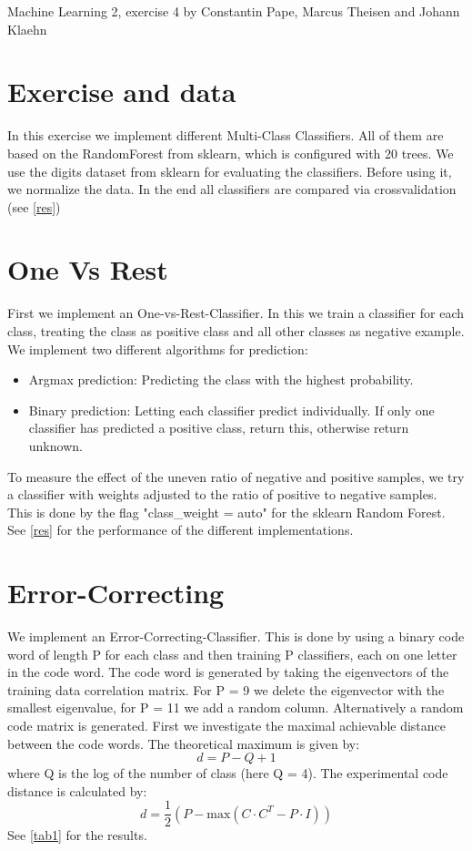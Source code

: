 \documentclass{article}
\begin{document}
Machine Learning 2, exercise 4 by Constantin Pape, Marcus Theisen and Johann Klaehn
 
\section{Exercise and data}

In this exercise we implement different Multi-Class Classifiers.
All of them are based on the RandomForest from sklearn, which is configured with 20 trees.
We use the digits dataset from sklearn for evaluating the classifiers.
Before using it, we normalize the data.
In the end all classifiers are compared via crossvalidation (see \autoref{res})

\section{One Vs Rest}

First we implement an One-vs-Rest-Classifier. In this we train a classifier for each class, treating the class as positive class and all other classes as negative example.
\newline
We implement two different algorithms for prediction:
\begin{itemize}
    \item Argmax prediction: Predicting the class with the highest probability.
    \item Binary prediction: Letting each classifier predict individually. If only one classifier has predicted a positive class, return this, otherwise return unknown.
\end{itemize}
To measure the effect of the uneven ratio of negative and positive samples, we try a classifier with weights adjusted to the ratio of positive to negative samples. 
This is done by the flag "class\_weight = auto" for the sklearn Random Forest.
See \autoref{res} for the performance of the different implementations.

\section{Error-Correcting}

We implement an Error-Correcting-Classifier. This is done by using a binary code word of length P for each class and then training P classifiers, each on one letter in the code word.
The code word is generated by taking the eigenvectors of the training data correlation matrix.
For P = 9 we delete the eigenvector with the smallest eigenvalue, for P = 11 we add a random column.
Alternatively a random code matrix is generated.
First we investigate the maximal achievable distance between the code words.
The theoretical maximum is given by:
\begin{equation*}
    d = P - Q + 1 
\end{equation*}
where Q is the log of the number of class (here Q = 4).
The experimental code distance is calculated by:
\begin{equation*}
    d = \frac{1}{2} (P - \textrm{max}(C \cdot C^{T} - P \cdot I) )
\end{equation*}
See \autoref{tab1} for the results. 
\end{document}
